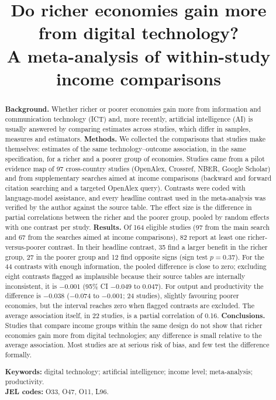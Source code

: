 \documentclass[11pt,a4paper]{article}
\title{Do richer economies gain more from digital technology?\\ A meta-analysis of within-study income comparisons}
\author{}
\date{}
\begin{document}
\maketitle


\begin{abstract}
\noindent\textbf{Background.} Whether richer or poorer economies gain more from information and communication technology (ICT) and, more recently, artificial intelligence (AI) is usually answered by comparing estimates across studies, which differ in samples, measures and estimators. \textbf{Methods.} We collected the comparisons that studies make themselves: estimates of the same technology--outcome association, in the same specification, for a richer and a poorer group of economies. Studies came from a pilot evidence map of 97 cross-country studies (OpenAlex, Crossref, NBER, Google Scholar) and from supplementary searches aimed at income comparisons (backward and forward citation searching and a targeted OpenAlex query). Contrasts were coded with language-model assistance, and every headline contrast used in the meta-analysis was verified by the author against the source table. The effect size is the difference in partial correlations between the richer and the poorer group, pooled by random effects with one contrast per study. \textbf{Results.} Of 164 eligible studies (97 from the main search and 67 from the searches aimed at income comparisons), 82 report at least one richer-versus-poorer contrast. In their headline contrast, 35 find a larger benefit in the richer group, 27 in the poorer group and 12 find opposite signs (sign test $p = 0.37$). For the 44 contrasts with enough information, the pooled difference is close to zero; excluding eight contrasts flagged as implausible because their source tables are internally inconsistent, it is $-0.001$ (95\% CI $-0.049$ to 0.047). For output and productivity the difference is $-0.038$ ($-0.074$ to $-0.001$; 24 studies), slightly favouring poorer economies, but the interval reaches zero when flagged contrasts are excluded. The average association itself, in 22 studies, is a partial correlation of 0.16. \textbf{Conclusions.} Studies that compare income groups within the same design do not show that richer economies gain more from digital technologies; any difference is small relative to the average association. Most studies are at serious risk of bias, and few test the difference formally.
\par\medskip\noindent\textbf{Keywords:} digital technology; artificial intelligence; income level; meta-analysis; productivity.\\
\textbf{JEL codes:} O33, O47, O11, L96.
\end{abstract}
\end{document}
